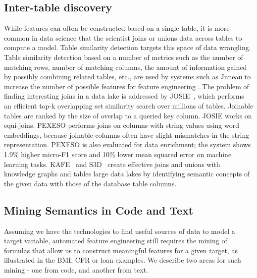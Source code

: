 \documentclass[sigconf, nonacm]{acmart}
\begin{document}
\subsection{Inter-table discovery}
\label{subsec:intertable}
While features can often be constructed based on a single table, it is more common in data science that the scientist joins or unions data across tables to compute a model.  Table similarity detection targets this space of data wrangling.  Table similarity detection based on a number of metrics such as the number of matching rows, number of matching columns, the amount of information gained by possibly combining related tables, etc., are used by systems such as Juneau to increase the number of possible features for feature engineering \cite{10.1145/3318464.3389726}.  The problem of finding interesting joins in a data lake is addressed by JOSIE~\cite{10.1145/3299869.3300065}, which performs an efficient top-k overlapping set similarity search over millions of tables.  Joinable tables are ranked by the size of overlap to a queried key column.  JOSIE works on equi-joins.  PEXESO \cite{Dong2021EfficientJT} performs joins on columns with string values using word embeddings, because joinable columns often have slight mismatches in the string representation.  PEXESO is also evaluated for data enrichment; the system shows 1.9\% higher micro-F1 score and 10\% lower mean squared error on machine learning tasks. KAFE~\cite{galhotra2019automated} and S3D~\cite{s3d} create effective joins and unions with knowledge graphs and tables large data lakes by identifying semantic concepts of the given data with those of the database table columns.

\subsection{Mining Semantics in Code and Text}
Assuming we have the technologies to find useful sources of data to model a target variable, automated feature engineering still requires the mining of formulas that allow us to construct meaningful features for a given target, as illustrated in the BMI, CFR or loan examples.  We describe two areas for such mining - one from code, and another from text.
\end{document}
